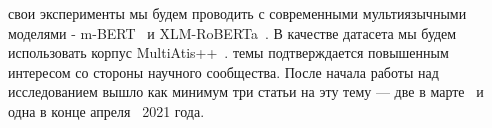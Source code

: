  свои эксперименты мы будем проводить с современными мультиязычными моделями - m-BERT~\cite{devlin-etal-2019-bert} и XLM-RoBERTa~\cite{Conneau2020UnsupervisedCR}.
В качестве датасета мы будем использовать корпус MultiAtis++~\cite{Xu2020EndtoEndSA}.
 темы подтверждается повышенным интересом со стороны научного сообщества.
После начала работы над исследованием вышло как минимум три статьи на эту тему — две в марте~\cite{Krishnan2021MultilingualCF,Tan2021CodeMixingOS} и одна в конце апреля~\cite{santy-etal-2021-bertologicomix} 2021 года.
